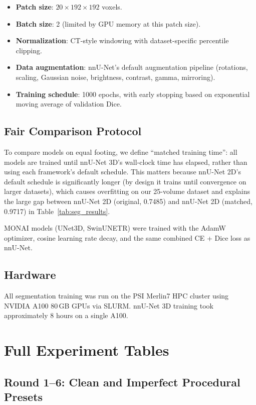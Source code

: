 \documentclass[11pt,a4paper]{article}
\begin{document}
\begin{itemize}
    \item \textbf{Patch size}: $20 \times 192 \times 192$ voxels.
    \item \textbf{Batch size}: 2 (limited by GPU memory at this patch size).
    \item \textbf{Normalization}: CT-style windowing with dataset-specific percentile clipping.
    \item \textbf{Data augmentation}: nnU-Net's default augmentation pipeline (rotations, scaling, Gaussian noise, brightness, contrast, gamma, mirroring).
    \item \textbf{Training schedule}: 1000 epochs, with early stopping based on exponential moving average of validation Dice.
\end{itemize}

\subsection{Fair Comparison Protocol}

To compare models on equal footing, we define ``matched training time'': all models are trained until nnU-Net 3D's wall-clock time has elapsed, rather than using each framework's default schedule. This matters because nnU-Net 2D's default schedule is significantly longer (by design it trains until convergence on larger datasets), which causes overfitting on our 25-volume dataset and explains the large gap between nnU-Net 2D (original, 0.7485) and nnU-Net 2D (matched, 0.9717) in Table~\ref{tab:seg_results}.

MONAI models (UNet3D, SwinUNETR) were trained with the AdamW optimizer, cosine learning rate decay, and the same combined CE + Dice loss as nnU-Net.

\subsection{Hardware}

All segmentation training was run on the PSI Merlin7 HPC cluster using NVIDIA A100 80\,GB GPUs via SLURM. nnU-Net 3D training took approximately 8 hours on a single A100.

\section{Full Experiment Tables}
\label{app:full_ablation}

\subsection{Round 1--6: Clean and Imperfect Procedural Presets}
\end{document}
